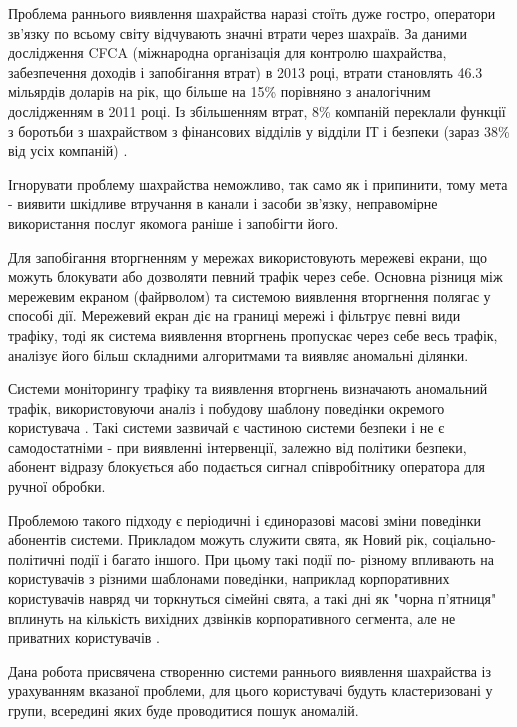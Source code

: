 \newpage
{}
  Проблема раннього виявлення шахрайства наразі стоїть дуже гостро, оператори зв'язку по всьому світу відчувають значні втрати через шахраїв. За даними дослідження CFCA (міжнародна організація для контролю шахрайства, забезпечення доходів і запобігання втрат) в 2013 році, втрати становлять 46.3 мільярдів доларів на рік, що більше на 15\% порівняно з аналогічним дослідженням в 2011 році. Із збільшенням втрат, 8\% компаній переклали функції з боротьби з шахрайством з фінансових відділів у відділи ІТ і безпеки (зараз 38\% від усіх компаній) \cite{cfca2013survey}.

  Ігнорувати проблему шахрайства неможливо, так само як і припинити, тому мета - виявити шкідливе втручання в канали і засоби зв'язку, неправомірне використання послуг якомога раніше і запобігти його.

  Для запобігання вторгненням у мережах використовують мережеві екрани, що можуть блокувати або дозволяти певний трафік через себе.
  Основна різниця між мережевим екраном (файрволом) та системою виявлення вторгнення полягає у способі дії. Мережевий екран діє на границі мережі і фільтрує певні види трафіку, тоді як система виявлення вторгнень пропускає через себе весь трафік, аналізує його більш складними алгоритмами та виявляє аномальні ділянки.

  Системи моніторингу трафіку та виявлення вторгнень визначають аномальний трафік, використовуючи аналіз і побудову шаблону поведінки окремого користувача \cite{telenik2009detection} \cite{rosastelecommunications}. Такі системи зазвичай є частиною системи безпеки і не є самодостатніми - при виявленні інтервенції, залежно від політики безпеки, абонент відразу блокується або подається сигнал співробітнику оператора для ручної обробки.

  Проблемою такого підходу є періодичні і єдиноразові масові зміни поведінки абонентів системи. Прикладом можуть служити свята, як Новий рік, соціально-політичні події і багато іншого. При цьому такі події по- різному впливають на користувачів з різними шаблонами поведінки, наприклад корпоративних користувачів навряд чи торкнуться сімейні свята, а такі дні як "чорна п'ятниця" вплинуть на кількість вихідних дзвінків корпоративного сегмента, але не приватних користувачів \cite{rader2014cdr}.

  Дана робота присвячена створенню системи раннього виявлення шахрайства із урахуванням вказаної проблеми, для цього користувачі будуть кластеризовані у групи, всередині яких буде проводитися пошук аномалій.